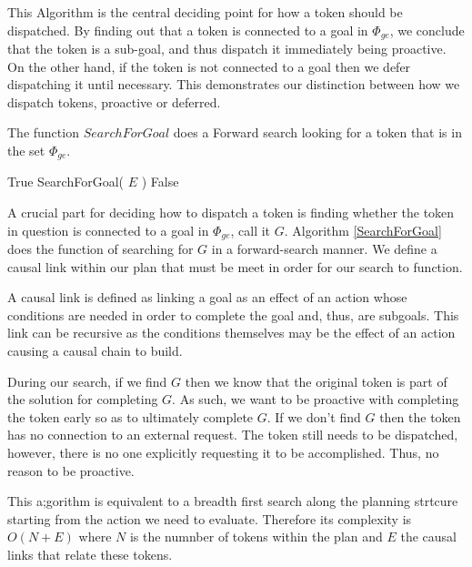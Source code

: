 This Algorithm is the central deciding point for how a
token should be dispatched. By finding out that a token is connected
to a goal in $\Phi_{ge}$, we conclude that the token is a sub-goal,
and thus dispatch it immediately being proactive.  On the other hand,
if the token is not connected to a goal then we defer dispatching it
until necessary.  This demonstrates our distinction between how we
dispatch tokens, proactive or deferred.

\begin{algorithm}
\caption{The function $SearchForGoal$ does a Forward search looking for a token that is
in the set $\Phi_{ge}$.}
\label{SearchForGoal}
\begin{algorithmic}
			\State \Return True
			\State \Return SearchForGoal( $E$ )
		\Else 
			\State \Return False
		\EndIf
	\EndFor
\EndFor
\EndFunction
\end{algorithmic}
\end{algorithm}

A crucial part for deciding how to dispatch a token is finding whether
the token in question is connected to a goal in $\Phi_{ge}$, call it
$G$. Algorithm \ref{SearchForGoal} does the function of searching for
$G$ in a forward-search manner. We define a causal link within our
plan that must be meet in order for our search to function.
\begin{definition}
\label{def:subgoalLink}
A causal link is defined as linking a goal as an effect of an action
whose conditions are needed in order to complete the goal and, thus,
are subgoals. This link can be recursive as the conditions themselves
may be the effect of an action causing a causal chain to build.
\end{definition}
During our search, if we find $G$ then we know that the original token
is part of the solution for completing $G$.  As such, we want to be
proactive with completing the token early so as to ultimately complete
$G$. If we don't find $G$ then the token has no connection to an
external request. The token still needs to be dispatched, however,
there is no one explicitly requesting it to be accomplished. Thus, no
reason to be proactive.

This a;gorithm is equivalent to a breadth first search along the
planning strtcure starting from the action we need to
evaluate. Therefore its complexity is $O(N+E)$ where $N$ is the
numnber of tokens within the plan and $E$ the causal links that relate
these tokens. 

